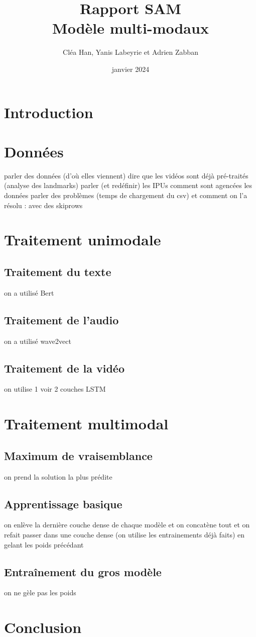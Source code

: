\documentclass[a4paper]{article}
\title{Rapport SAM \\ Modèle multi-modaux}
\author{Cléa Han, Yanis Labeyrie et Adrien Zabban}
\date{janvier 2024}
\begin{document}
\maketitle

\section{Introduction}

\section{Données}
parler des données (d'où elles viennent)
dire que les vidéos sont déjà pré-traités (analyse des landmarks)
parler (et redéfinir) les IPUs
comment sont agencées les données
parler des problèmes (temps de chargement du csv) et comment on l'a résolu : avec des skiprows

\section{Traitement unimodale}

\subsection{Traitement du texte}
on a utilisé Bert

\subsection{Traitement de l'audio}
on a utilisé wave2vect

\subsection{Traitement de la vidéo}
on utilise 1 voir 2 couches LSTM

\section{Traitement multimodal}

\subsection{Maximum de vraisemblance}
on prend la solution la plus prédite

\subsection{Apprentissage basique}
on enlève la dernière couche dense de chaque modèle et on concatène tout et on refait passer dans une couche dense
(on utilise les entrainements déjà faits) en gelant les poids précédant

\subsection{Entraînement du gros modèle}
on ne gèle pas les poids

\section{Conclusion}
\end{document}
